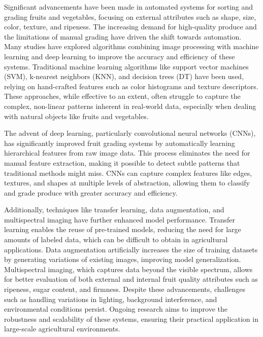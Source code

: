 \documentclass[12pt,a4paper]{report}
\begin{document}
\hspace{1cm}\hspace{1cm}Significant advancements have been made in automated systems for sorting and grading fruits and vegetables, focusing on external attributes such as shape, size, color, texture, and ripeness. The increasing demand for high-quality produce and the limitations of manual grading have driven the shift towards automation. Many studies have explored algorithms combining image processing with machine learning and deep learning to improve the accuracy and efficiency of these systems. Traditional machine learning algorithms like support vector machines (SVM), k-nearest neighbors (KNN), and decision trees (DT) have been used, relying on hand-crafted features such as color histograms and texture descriptors. These approaches, while effective to an extent, often struggle to capture the complex, non-linear patterns inherent in real-world data, especially when dealing with natural objects like fruits and vegetables.

The advent of deep learning, particularly convolutional neural networks (CNNs), has significantly improved fruit grading systems by automatically learning hierarchical features from raw image data. This process eliminates the need for manual feature extraction, making it possible to detect subtle patterns that traditional methods might miss. CNNs can capture complex features like edges, textures, and shapes at multiple levels of abstraction, allowing them to classify and grade produce with greater accuracy and efficiency.

Additionally, techniques like transfer learning, data augmentation, and multispectral imaging have further enhanced model performance. Transfer learning enables the reuse of pre-trained models, reducing the need for large amounts of labeled data, which can be difficult to obtain in agricultural applications. Data augmentation artificially increases the size of training datasets by generating variations of existing images, improving model generalization. Multispectral imaging, which captures data beyond the visible spectrum, allows for better evaluation of both external and internal fruit quality attributes such as ripeness, sugar content, and firmness. Despite these advancements, challenges such as handling variations in lighting, background interference, and environmental conditions persist. Ongoing research aims to improve the robustness and scalability of these systems, ensuring their practical application in large-scale agricultural environments.
\end{document}
